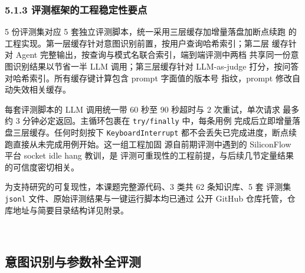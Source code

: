 \documentclass[a4paper]{article}
\theoremstyle{definition}
\theoremstyle{plain}
\theoremstyle{remark}
\newcommand{\reftab}[1]{表 \ref{#1}}
\let\oldcite\cite
\renewcommand{\cite}[1]{\textsuperscript{\oldcite{#1}}}
\begin{document}
\subsubsection*{5.1.3 \quad 评测框架的工程稳定性要点}

5 份评测集对应 5 套独立评测脚本，统一采用三层缓存加增量落盘加断点续跑
的工程实现。第一层缓存针对意图识别前置，按用户查询哈希索引；第二层
缓存针对 Agent 完整输出，按查询与模式名联合索引，端到端评测中两档
共享同一份意图识别结果以节省一半 LLM 调用；第三层缓存针对 LLM-as-judge
打分，按问答对哈希索引。所有缓存键计算包含 prompt 字面值的版本号
指纹，prompt 修改自动失效相关缓存。

每套评测脚本的 LLM 调用统一带 60 秒至 90 秒超时与 2 次重试，单次请求
最多约 3 分钟必定返回。主循环包裹在 \texttt{try/finally} 中，每条用例
完成后立即增量落盘三层缓存。任何时刻按下 \texttt{KeyboardInterrupt}
都不会丢失已完成进度，断点续跑直接从未完成用例开始。这一组工程加固
源自前期评测中遇到的 SiliconFlow 平台 socket idle hang 教训，是
评测可重现性的工程前提，与后续几节定量结果的可信度密切相关。

为支持研究的可复现性，本课题完整源代码、3 类共 62 条知识库、5 套
评测集 \texttt{jsonl} 文件、原始评测结果与一键运行脚本均已通过
公开 GitHub 仓库托管，仓库地址与简要目录结构详见附录。



﻿%

\subsection{意图识别与参数补全评测}
\label{sec:intent-eval}
\end{document}
